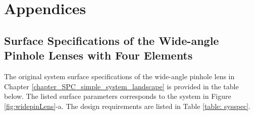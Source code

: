 
\chapter{Appendices} %
\label{Appendices} %
\graphicspath{ {./Appendix/figures/} }  %
\captionsetup[figure]{labelfont=bf}
\captionsetup{margin=1.5em}
\captionsetup[table]{labelfont=bf}


\begin{comment}
\section{Spherical aberration derivation}
derivation of the thinlens Spherical aberration case for the intro, magnifier one. 

\newpage

\section{landscape cases}
What do I mean by this? Is it about better descriptions of what happened for each landscape cases? To be remembered. 
\newpage
\end{comment}
\section{Surface Specifications of the Wide-angle Pinhole Lenses with Four Elements} 
\label{apdx: wide-angle-specs_4_elements}

The original system surface specifications of the wide-angle pinhole lens in Chapter \ref{chapter_SPC_simple_system_landscape} is provided in the table below. The listed surface parameters corresponds to the system in Figure \ref{fig:widepinLens}-a. The design requirements are listed in Table \ref{table: sysspec}.


